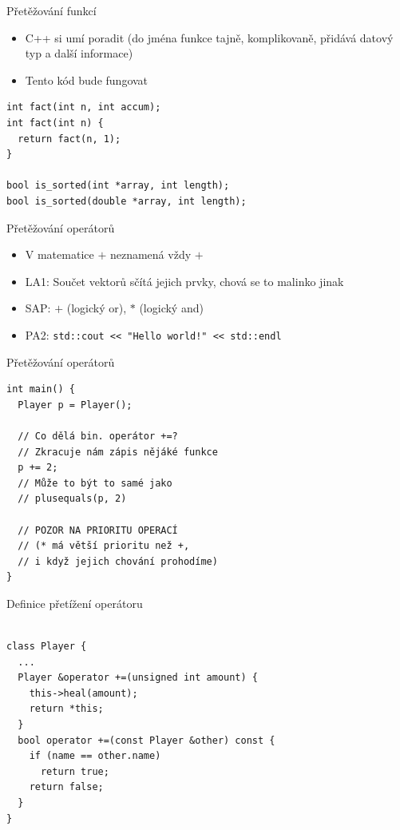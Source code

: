 \documentclass[aspectratio=1610]{beamer}
\begin{document}
\begin{frame}[fragile]{Přetěžování funkcí}

\begin{itemize}
  \item C++ si umí poradit (do jména funkce tajně, komplikovaně, přidává datový typ a další informace)
  \item Tento kód bude fungovat
\end{itemize}

\begin{verbatim}
int fact(int n, int accum);
int fact(int n) {
  return fact(n, 1);
}

bool is_sorted(int *array, int length);
bool is_sorted(double *array, int length);
\end{verbatim}

\end{frame}

\begin{frame}{Přetěžování operátorů}

\begin{itemize}
  \item V matematice $+$ neznamená vždy $+$
  \item LA1: Součet vektorů sčítá jejich prvky, chová se to malinko jinak
  \item SAP: $+$ (logický or), $*$ (logický and)
  \item PA2: \texttt{std::cout << "Hello world!" << std::endl}
\end{itemize}

\end{frame}

\begin{frame}[fragile]{Přetěžování operátorů}

\begin{verbatim}
int main() {
  Player p = Player();

  // Co dělá bin. operátor +=?
  // Zkracuje nám zápis nějáké funkce
  p += 2;
  // Může to být to samé jako
  // plusequals(p, 2)

  // POZOR NA PRIORITU OPERACÍ
  // (* má větší prioritu než +,
  // i když jejich chování prohodíme)
}
\end{verbatim}

\end{frame}

\begin{frame}[fragile]{Definice přetížení operátoru}

\begin{verbatim}

class Player {
  ...
  Player &operator +=(unsigned int amount) {
    this->heal(amount);
    return *this;
  }
  bool operator +=(const Player &other) const {
    if (name == other.name)
      return true;
    return false;
  }
}

\end{verbatim}

\end{frame}
\end{document}
